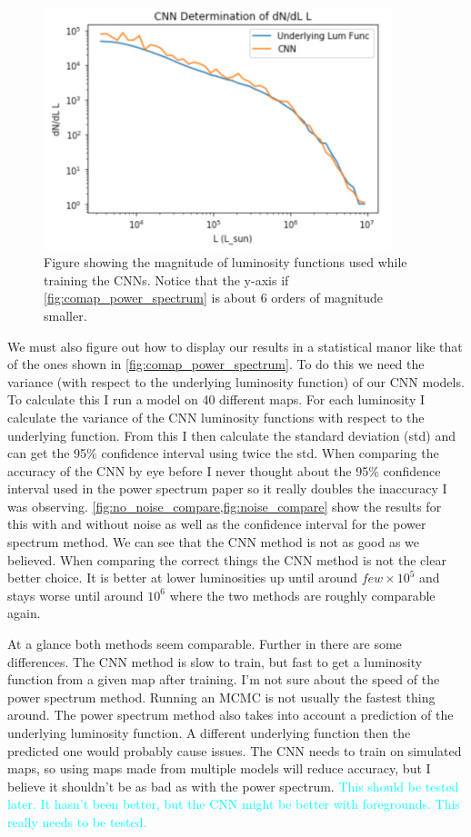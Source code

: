 \documentclass{article}
\newcommand{\dnp}[1]{\textcolor{cyan}{#1}}
\begin{document}
		\begin{figure}[H]
			\centering
			\includegraphics[width=0.9\textwidth]{lum_func_size.pdf}
			\caption{Figure showing the magnitude of luminosity functions used while training the CNNs.  Notice that the y-axis if \cref{fig:comap_power_spectrum} is about 6 orders of magnitude smaller.}
			\label{fig:lum_func_size}
		\end{figure}

		We must also figure out how to display our results in a statistical manor like that of the ones shown in \cref{fig:comap_power_spectrum}.  To do this we need the variance (with respect to the underlying luminosity function) of our CNN models.  To calculate this I run a model on 40 different maps.  For each luminosity I calculate the variance of the CNN luminosity functions with respect to the underlying function.  From this I then calculate the standard deviation (std) and can get the 95\% confidence interval using twice the std.  When comparing the accuracy of the CNN by eye before I never thought about the 95\% confidence interval used in the power spectrum paper so it really doubles the inaccuracy I was observing.  \cref{fig:no_noise_compare,fig:noise_compare} show the results for this with and without noise as well as the confidence interval for the power spectrum method.  We can see that the CNN method is not as good as we believed.  When comparing the correct things the CNN method is not the clear better choice.  It is better at lower luminosities up until around \(few \times 10^5\) and stays worse until around \(10^6\) where the two methods are roughly comparable again.

		At a glance both methods seem comparable.  Further in there are some differences.  The CNN method is slow to train, but fast to get a luminosity function from a given map after training.  I'm not sure about the speed of the power spectrum method.  Running an MCMC is not usually the fastest thing around.  The power spectrum method also takes into account a prediction of the underlying luminosity function.  A different underlying function then the predicted one would probably cause issues.  The CNN needs to train on simulated maps, so using maps made from multiple models will reduce accuracy, but I believe it shouldn't be as bad as with the power spectrum.  \dnp{This should be tested later.}  \dnp{It hasn't been better, but the CNN might be better with foregrounds.  This really needs to be tested.}  
\end{document}
